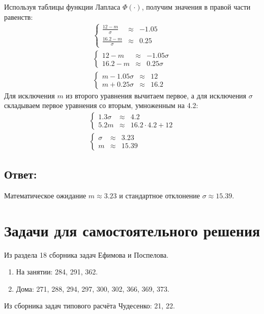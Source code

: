 Используя таблицы функции Лапласа $\Phi(\cdot)$, получим значения в правой части равенств:
\begin{gather}
    \left \{
    \begin{array}{lcl}
        \frac{12-m}{\sigma}   & \approx & -1.05 \\
        \frac{16.2-m}{\sigma} & \approx & 0.25
    \end{array}
    \right . \\
%
    \left \{
    \begin{array}{lcl}
        12 - m   & \approx & -1.05 \sigma \\
        16.2 - m & \approx & 0.25 \sigma
    \end{array}
    \right . \\
%
    \left \{
    \begin{array}{lcl}
        m - 1.05 \sigma & \approx & 12   \\
        m + 0.25 \sigma & \approx & 16.2
    \end{array}
    \right .
\end{gather}
Для исключения $m$ из второго уравнения вычитаем первое, а для исключения $\sigma$ складываем первое уравнения со вторым, умноженным на 4.2:
\begin{gather}
    \left \{
    \begin{array}{lcl}
        1.3 \sigma & \approx & 4.2                 \\
        5.2 m      & \approx & 16.2 \cdot 4.2 + 12
    \end{array}
    \right . \\
%
    \left \{
    \begin{array}{lcl}
        \sigma & \approx & 3.23  \\
        m      & \approx & 15.39
    \end{array}
    \right .
\end{gather}

\subsection*{Ответ:}
Математическое ожидание $m \approx 3.23$ и стандартное отклонение $\sigma \approx 15.39$.

\section*{Задачи для самостоятельного решения}

Из раздела 18 сборника задач Ефимова и Поспелова.
\begin{enumerate}
    \item На занятии: 284, 291, 362.
    \item Дома: 271, 288, 294, 297, 300, 302, 366, 369, 373.
\end{enumerate}

Из сборника задач типового расчёта Чудесенко: 21, 22.